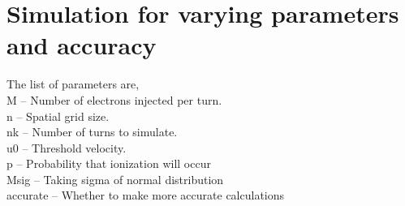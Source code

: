 \documentclass[11pt, a4paper]{article}
\begin{document}
\section{Simulation for varying parameters and accuracy}
The list of parameters are,\\
M -- Number of electrons injected per turn.\\
n -- Spatial grid size.\\
nk -- Number of turns to simulate.\\
u0 -- Threshold velocity.\\
p -- Probability that ionization will occur\\               
Msig -- Taking sigma of normal distribution\\
accurate -- Whether to make more accurate calculations\\
\end{document}
